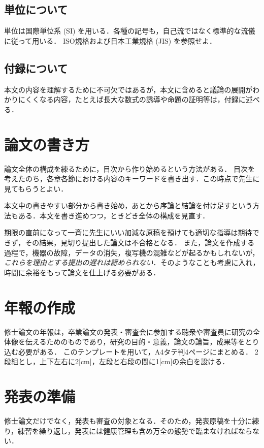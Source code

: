 \documentclass[10pt,a4paper,notitlepage,oneside,twocolumn]{abst_jsarticle}
\begin{document}
\subsection{単位について} \label{subsec:section24}
単位は国際単位系 (SI) を用いる．各種の記号も，自己流ではなく標準的な流儀に従って用いる．
ISO規格および日本工業規格 (JIS) を参照せよ．

\subsection{付録について}

本文の内容を理解するために不可欠ではあるが，本文に含めると議論の展開がわかりにくくなる内容，たとえば長大な数式の誘導や命題の証明等は，付録に述べる．


\section{論文の書き方}

論文全体の構成を練るために，目次から作り始めるという方法がある．
目次を考えたのち，各章各節における内容のキーワードを書き出す．この時点で先生に見てもらうとよい．

本文中の書きやすい部分から書き始め，あとから序論と結論を付け足すという方法もある．本文を書き進めつつ，ときどき全体の構成を見直す．

期限の直前になって一斉に先生にいい加減な原稿を預けても適切な指導は期待できず，その結果，見切り提出した論文は不合格となる．
また，論文を作成する過程で，機器の故障，データの消失，複写機の混雑などが起るかもしれないが，
{\em これらを理由とする提出の遅れは認められない}．そのようなことも考慮に入れ，時間に余裕をもって論文を仕上げる必要がある．


\section{年報の作成}

修士論文の年報は，卒業論文の発表・審査会に参加する聴衆や審査員に研究の全体像を伝えるためのものであり，研究の目的・意義，論文の論旨，成果等をとり込む必要がある．
このテンプレートを用いて，A4タテ判4ページにまとめる．
2段組とし，上下左右に2[cm]，左段と右段の間に1[cm]の余白を設ける．



\section{発表の準備}

修士論文だけでなく，発表も審査の対象となる．そのため，発表原稿を十分に練り，練習を繰り返し，発表には健康管理も含め万全の態勢で臨まなければならない．
\end{document}

